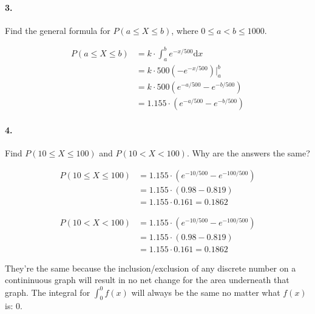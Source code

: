     \pagebreak

    \paragraph*{3.}
    Find the general formula for $P(a \leq X \leq b)$, where $0 \leq a < b  \leq 1000$.
    \\
    \begin{mdframed}
        \begin{align*}
            P(a \leq X \leq b)  & = k \cdot \int_{a}^{b}e^{-x/500}\mathrm{d}x   \\
                                & = k \cdot 500(-e^{-x/500})\big|_{a}^{b}       \\
                                & = k \cdot 500(e^{-a/500} - e^{-b/500})        \\
                                & = \boxed{1.155\cdot (e^{-a/500} - e^{-b/500})}
        \end{align*}
    \end{mdframed}

    \paragraph*{4.}
    Find $P(10 \leq X \leq 100)$ and $P(10 < X < 100)$. Why are the answers the same?
    \\
    \begin{mdframed}
        \begin{align*}
            P(10 \leq X \leq 100)   & = 1.155 \cdot (e^{-10/500} - e^{-100/500})    \\
                                    & = 1.155 \cdot (0.98 - 0.819)                  \\
                                    & = 1.155 \cdot 0.161 = 0.1862
        \end{align*}

        \begin{align*}
            P(10 < X < 100)   & = 1.155 \cdot (e^{-10/500} - e^{-100/500})          \\
                                    & = 1.155 \cdot (0.98 - 0.819)                  \\
                                    & = 1.155 \cdot 0.161 = 0.1862
        \end{align*}

        They're the same because the inclusion/exclusion of any discrete number on a contininuous graph will result in no net change for the area underneath that graph. The integral for $\int_{0}^{0}f(x)$ will always be the same no matter what $f(x)$ is: 0.
    \end{mdframed}

